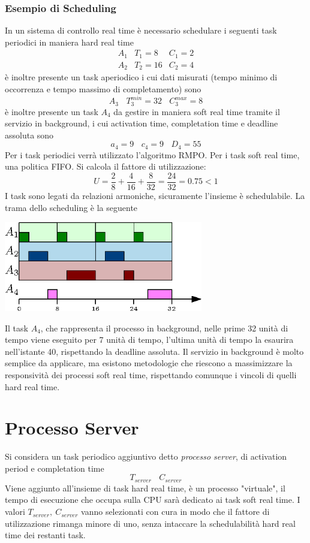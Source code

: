 \documentclass[10pt, letterpaper]{report}
\begin{document}
\subsubsection{Esempio di Scheduling}
In un sistema di controllo real time è necessario schedulare i seguenti task periodici in maniera hard real time 
$$ \begin{matrix}
    A_1 &   T_1 = 8 &  C_1 = 2 \\ 
    A_2 &   T_2 = 16 &  C_2 = 4
\end{matrix}$$
è inoltre presente un task aperiodico i cui dati misurati (tempo minimo di occorrenza e tempo massimo di completamento) sono
$$ A_3 \ \ \ \  T_3^{min}=32 \ \ \ \  C_3^{max}=8$$
è inoltre presente un task $A_4$ da gestire in maniera soft real time tramite il servizio in background, i cui activation time, completation time e deadline assoluta sono 
$$ a_4 = 9 \ \ \ \ c_4 = 9 \ \ \ \ D_4 = 55$$
Per i task periodici verrà utilizzato l'algoritmo RMPO. Per i task soft real time, una politica FIFO. Si calcola il fattore di utilizzazione: 
$$ U=\frac{2}{8}+\frac{4}{16}+\frac{8}{32}=\frac{24}{32}=0.75<1$$
I task sono legati da relazioni armoniche, sicuramente l'insieme è schedulabile. La trama dello scheduling è la seguente
\begin{center}
    \includegraphics[width=0.65\textwidth ]{images/esempioBackground.eps}
\end{center}
Il task $A_4$, che rappresenta il processo in background, nelle prime 32 unità di tempo viene eseguito per 7 unità di tempo, l'ultima unità di tempo la esaurira nell'istante 40, rispettando la deadline assoluta.
Il servizio in background è molto semplice da applicare, ma esistono metodologie che riescono a massimizzare la responsività dei processi soft real time, rispettando comunque i vincoli di quelli hard real time.\flowerLine 
\section{Processo Server}
Si considera un task periodico aggiuntivo detto \textit{processo server}, di activation period e completation time $$ T_{server} \ \ \ \ C_{server}$$
Viene aggiunto all'insieme di task hard real time, è un processo "virtuale", il tempo di esecuzione che occupa sulla CPU sarà dedicato ai task soft real time. I valori $T_{server}, \ C_{server}$ vanno selezionati con cura in modo che il fattore di utilizzazione rimanga minore di uno, senza intaccare la schedulabilità hard real time dei restanti task.
\end{document}
